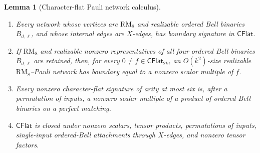 \documentclass[11pt,letterpaper,onecolumn]{article}
\theoremstyle{plain}
\newtheorem{lemma}[lemma]{Lemma}
\theoremstyle{definition}
\theoremstyle{remark}
\newcommand{\RMcore}{\mathrm{RM}_8}
\begin{document}
\begin{lemma}[Character-flat Pauli network calculus]
\label{lem:v4-character-flat-calculus}
\begin{enumerate}
\item Every network whose vertices are \(\RMcore\) and realizable ordered Bell
      binaries \(B_{d,\ell}\), and whose internal edges are \(X\)-edges, has
      boundary signature in \(\mathsf{CFlat}\).
\item If \(\RMcore\) and realizable nonzero representatives of all four ordered
      Bell binaries \(B_{d,\ell}\) are retained, then, for every
      \(0\ne f\in\mathsf{CFlat}_{2k}\), an \(O(k^2)\)-size realizable
      \(\RMcore\)--Pauli network has boundary equal to a nonzero
      scalar multiple of \(f\).
\item Every nonzero character-flat signature of arity at most six is, after
      a permutation of inputs, a nonzero scalar multiple of a product of ordered
      Bell binaries on a perfect matching.
\item \(\mathsf{CFlat}\) is closed under nonzero scalars, tensor products,
      permutations of inputs, single-input ordered-Bell attachments through \(X\)-edges, and nonzero tensor factors.
\end{enumerate}
\end{lemma}
\end{document}

